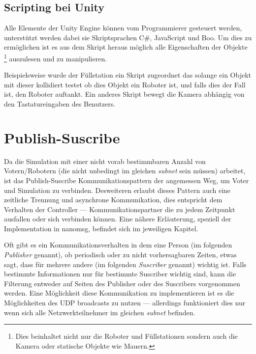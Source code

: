 \documentclass[
    12pt,
    bibliography=totoc,
    ngerman,
    enabledeprecatedfontcommands
]{scrartcl}
\begin{document}
\subsection{Scripting bei Unity}
Alle Elemente der Unity Engine k{\"{o}}nnen vom Programmierer gesteuert werden, unterst{\"{u}}tzt werden dabei sie Skriptsprachen C\#, JavaScript und Boo.\cite{wiki:unity} Um dies zu erm{\"{o}}glichen ist es aus dem Skript heraus m{\"{o}}glich alle Eigenschaften
der Objekte \footnote{Dies beinhaltet nicht nur die Roboter und F{\"{u}}llstationen sondern auch die Kamera oder statische Objekte wie Mauern.} auszulesen und zu manipulieren.

Beispielsweise wurde der F{\"{u}}llstation ein Skript zugeordnet das solange ein Objekt mit dieser kollidiert testet ob dies Objekt ein Roboter ist, und falls dies der Fall ist,
den Roboter auftankt. Ein anderes Skript bewegt die Kamera abh{\"{a}}ngig von den Tastatureingaben des Benutzers.

\clearpage
\section{Publish-Suscribe}
Da die Simulation mit einer nicht vorab bestimmbaren Anzahl von Votern/Robotern (die nicht unbedingt im gleichen \textit{subnet} sein m{\"{u}}ssen) arbeitet, ist das Publish-Suscribe Kommunikationspattern\cite{pubsub}
der angemessen Weg, um Voter und Simulation zu verbinden.
Desweiteren erlaubt dieses Pattern auch eine zeitliche Trennung und asynchrone Kommunikation, dies entspricht dem Verhalten der Controller --- Kommunikationspartner die zu jedem Zeitpunkt ausfallen oder
sich verbinden k{\"{o}}nnen. Eine n{\"{a}}here Erl{\"{a}}uterung, speziell der Implementation in nanomsg, befindet sich im jeweiligen Kapitel.

Oft gibt es ein Kommunikationsverhalten in dem eine Person (im folgenden \textit{Publisher} genannt), ob periodisch oder zu nicht vorhersagbaren Zeiten, etwas sagt,
dass f{\"{u}}r mehrere andere (im folgenden \textit{Suscriber} genannt) wichtig ist. Falls bestimmte Informationen nur f{\"{u}}r bestimmte Suscriber wichtig sind, kann die Filterung entweder auf Seiten des Publisher oder des Suscribers vorgenommen werden.
Eine M{\"{o}}glichkeit diese Kommunikation zu implementieren ist es die M{\"{o}}glichkeiten des UDP broadcasts zu nutzen --- allerdings funktioniert dies nur wenn sich alle Netzwerkteilnehmer im gleichen
\textit{subnet} befinden.
\end{document}

